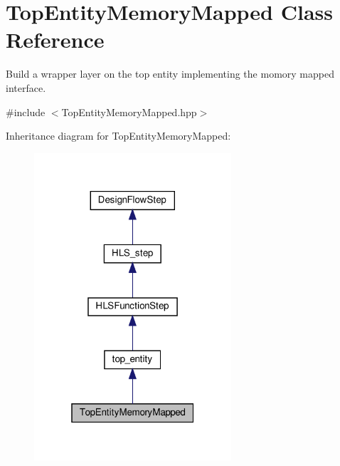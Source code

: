 \hypertarget{classTopEntityMemoryMapped}{}\section{Top\+Entity\+Memory\+Mapped Class Reference}
\label{classTopEntityMemoryMapped}


Build a wrapper layer on the top entity implementing the momory mapped interface.  




{\ttfamily \#include $<$Top\+Entity\+Memory\+Mapped.\+hpp$>$}



Inheritance diagram for Top\+Entity\+Memory\+Mapped\+:
\nopagebreak
\begin{figure}[H]
\begin{center}
\leavevmode
\includegraphics[width=208pt]{db/d65/classTopEntityMemoryMapped__inherit__graph}
\end{center}
\end{figure}


